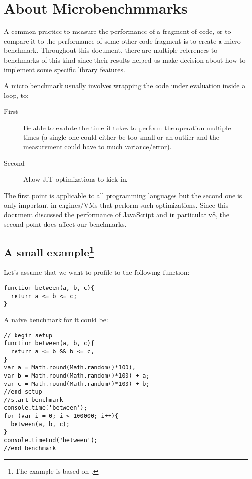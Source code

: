 \section*{About Microbenchmmarks}
A common practice to measure the performance of a fragment of code, or to compare it to the performance of some other code fragment is to create a micro benchmark. Throughout this document, there are multiple references to benchmarks of this kind since their results helped us make decision about how to implement some specific library features.

A micro benchmark usually involves wrapping the code under evaluation inside a loop, to:

\begin{description}
\item[First] Be able to evalute the time it takes to perform the operation multiple times (a single one could either be too small or an outlier and the measurement could have to much variance/error).
\item[Second] Allow JIT optimizations to kick in.
\end{description}

The first point is applicable to all programming languages but the second one is only important in engines/VMs that perform such optimizations. Since this document discussed the performance of JavaScript and in particular v8, the second point does affect our benchmarks.

\subsection{A small example\protect\footnote{The example is based on \cite{mraleph-bc}.}}
Let's assume that we want to profile to the following function:
\begin{lstlisting}[caption=Function to benchmark]
function between(a, b, c){
  return a <= b <= c;
}
\end{lstlisting}

A naive benchmark for it could be:
\begin{lstlisting}[caption=Naive benchmark]
// begin setup
function between(a, b, c){
  return a <= b && b <= c;
}
var a = Math.round(Math.random()*100);
var b = Math.round(Math.random()*100) + a;
var c = Math.round(Math.random()*100) + b;
//end setup
//start benchmark
console.time('between');
for (var i = 0; i < 100000; i++){
  between(a, b, c);
}
console.timeEnd('between');
//end benchmark
\end{lstlisting}


